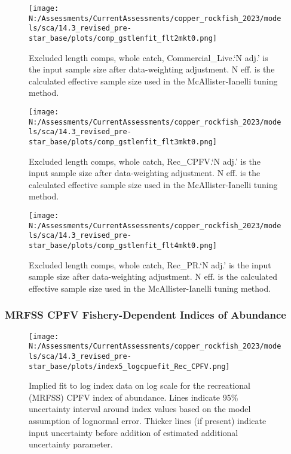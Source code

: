 \documentclass[11pt,
  english,
  letterpaper,
]{article}
\begin{document}
\begin{figure}
\centering
\texttt{[image: N:/Assessments/CurrentAssessments/copper\_rockfish\_2023/models/sca/14.3\_revised\_pre-star\_base/plots/comp\_gstlenfit\_flt2mkt0.png]}
\caption{Excluded length comps, whole catch, Commercial\_Live.`N adj.' is the input sample size after data-weighting adjustment. N eff. is the calculated effective sample size used in the McAllister-Ianelli tuning method.\label{fig:comp_gstlenfit_flt2mkt0}}
\end{figure}

\begin{figure}
\centering
\texttt{[image: N:/Assessments/CurrentAssessments/copper\_rockfish\_2023/models/sca/14.3\_revised\_pre-star\_base/plots/comp\_gstlenfit\_flt3mkt0.png]}
\caption{Excluded length comps, whole catch, Rec\_CPFV.`N adj.' is the input sample size after data-weighting adjustment. N eff. is the calculated effective sample size used in the McAllister-Ianelli tuning method.\label{fig:comp_gstlenfit_flt3mkt0}}
\end{figure}

\begin{figure}
\centering
\texttt{[image: N:/Assessments/CurrentAssessments/copper\_rockfish\_2023/models/sca/14.3\_revised\_pre-star\_base/plots/comp\_gstlenfit\_flt4mkt0.png]}
\caption{Excluded length comps, whole catch, Rec\_PR.`N adj.' is the input sample size after data-weighting adjustment. N eff. is the calculated effective sample size used in the McAllister-Ianelli tuning method.\label{fig:comp_gstlenfit_flt4mkt0}}
\end{figure}

\pagebreak

\hypertarget{mrfss-cpfv-fishery-dependent-indices-of-abundance}{%
\subsubsection{MRFSS CPFV Fishery-Dependent Indices of Abundance}\label{mrfss-cpfv-fishery-dependent-indices-of-abundance}}

\begin{figure}
\centering
\texttt{[image: N:/Assessments/CurrentAssessments/copper\_rockfish\_2023/models/sca/14.3\_revised\_pre-star\_base/plots/index5\_logcpuefit\_Rec\_CPFV.png]}
\caption{Implied fit to log index data on log scale for the recreational (MRFSS) CPFV index of abundance. Lines indicate 95\% uncertainty interval around index values based on the model assumption of lognormal error. Thicker lines (if present) indicate input uncertainty before addition of estimated additional uncertainty parameter.\label{fig:mrfss-cpfv-index-fit}}
\end{figure}
\end{document}
